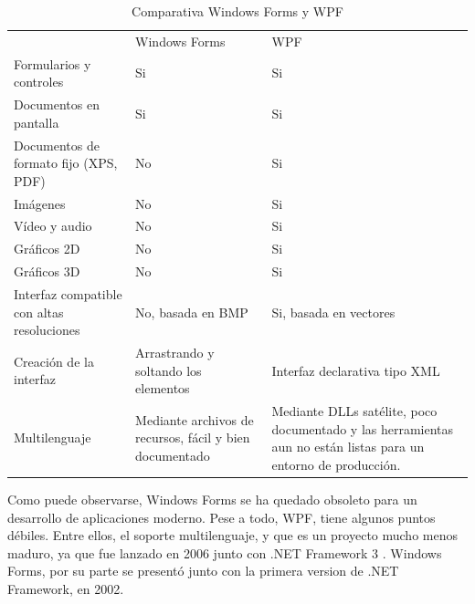 \begin{table}[H]
	\begin{center}
		\begin{tabular}{|p{5cm} | p{4cm} | p{4cm}|}
			\rowcolor{darkgray}                         & \color{white}Windows Forms               & \color{white}WPF \\
			Formularios y controles                     & Si                                       & Si \\
			Documentos en pantalla                      & Si                                       & Si \\
			Documentos de formato fijo (XPS, PDF)       & No                                       & Si \\
			Im\'{a}genes                                & No                                       & Si \\
			V\'{i}deo y audio                           & No                                       & Si \\
			Gr\'{a}ficos 2D                             & No                                       & Si \\
			Gr\'{a}ficos 3D                             & No                                       & Si \\
			Interfaz compatible con altas resoluciones  & No, basada en BMP                        & Si, basada en vectores \\
			Creaci\'{o}n de la interfaz                 & Arrastrando y soltando los elementos     & Interfaz declarativa tipo XML \\
			Multilenguaje                               & Mediante archivos de recursos, f\'{a}cil y bien documentado & Mediante DLLs sat\'{e}lite, poco documentado y las herramientas aun no est\'{a}n listas para un entorno de producci\'{o}n. \\
			\hline
		\end{tabular}
	\end{center}
	\caption[Comparativa Windows Forms y WPF]{Comparativa Windows Forms y WPF}
	\label{ComparativaWPF}
\end{table}

Como puede observarse, Windows Forms se ha quedado obsoleto para un desarrollo 
de aplicaciones moderno.
Pese a todo, WPF, tiene algunos puntos d\'ebiles. Entre ellos, el soporte multilenguaje, y que es un proyecto
mucho menos maduro, ya que fue lanzado en 2006 junto con .NET Framework 3 \cite{WPF:Overview}. Windows Forms,
por su parte se present\'o junto con la primera version de .NET Framework, en 2002.

